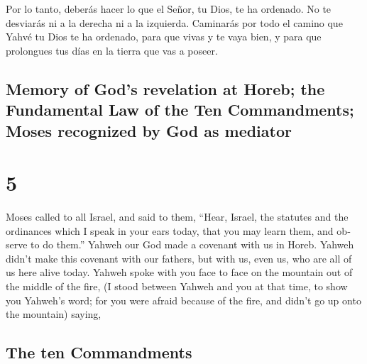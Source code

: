\begin{paracol}{2}
 Por lo tanto, deberás hacer lo que el Señor, tu Dios, te
ha ordenado. No te desviarás ni a la derecha ni a la izquierda.
 Caminarás por todo el camino que Yahvé tu Dios te ha
ordenado, para que vivas y te vaya bien, y para que prolongues tus días
en la tierra que vas a poseer.

\switchcolumn
\begin{otherlanguage}{english}

\hypertarget{memory-of-gods-revelation-at-horeb-the-fundamental-law-of-the-ten-commandments-moses-recognized-by-god-as-mediator}{%
\subsection{Memory of God's revelation at Horeb; the Fundamental Law of
the Ten Commandments; Moses recognized by God as
mediator}\label{memory-of-gods-revelation-at-horeb-the-fundamental-law-of-the-ten-commandments-moses-recognized-by-god-as-mediator}}

\hypertarget{section-9}{%
\section{5}\label{section-9}}

 Moses called to all Israel, and said to them, ``Hear,
Israel, the statutes and the ordinances which I speak in your ears
today, that you may learn them, and observe to do them.'' 
Yahweh our God made a covenant with us in Horeb.  Yahweh
didn't make this covenant with our fathers, but with us, even us, who
are all of us here alive today.  Yahweh spoke with you
face to face on the mountain out of the middle of the fire,
 (I stood between Yahweh and you at that time, to show you
Yahweh's word; for you were afraid because of the fire, and didn't go up
onto the mountain) saying,

\hypertarget{the-ten-commandments}{%
\subsection{The ten Commandments}\label{the-ten-commandments}}


\end{otherlanguage}
\end{paracol}
